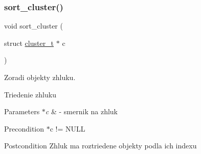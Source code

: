 \subsubsection{\texorpdfstring{sort\+\_\+cluster()}{sort\_cluster()}}
{\footnotesize\ttfamily void sort\+\_\+cluster (\begin{DoxyParamCaption}\item[{struct \hyperlink{structcluster__t}{cluster\+\_\+t} $\ast$}]{c }\end{DoxyParamCaption})}



Zoradi objekty zhluku. 

Triedenie zhluku 
\begin{DoxyParams}{Parameters}
{\em $\ast$c} & -\/ smernik na zhluk \\
\hline
\end{DoxyParams}
\begin{DoxyPrecond}{Precondition}
$\ast$c != N\+U\+LL 
\end{DoxyPrecond}
\begin{DoxyPostcond}{Postcondition}
Zhluk ma roztriedene objekty podla ich indexu 
\end{DoxyPostcond}
